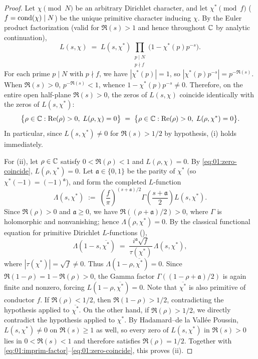 \begin{proof}
Let $\chi \pmod{N}$ be an arbitrary Dirichlet character, and let $\chi^* \pmod{f}$ ($f = \operatorname{cond}(\chi) \mid N$) be the unique primitive character inducing $\chi$. By the Euler product factorization (valid for $\Re(s) > 1$ and hence throughout $\mathbb{C}$ by analytic continuation),
\begin{equation}
\label{eq:01:imprim-factor}
  L(s, \chi) \;=\; L(s, \chi^*) \prod_{\substack{p \mid N \\ p \nmid f}} \bigl(1 - \chi^*(p) p^{-s}\bigr).
\end{equation}
For each prime $p \mid N$ with $p \nmid f$, we have $|\chi^*(p)| = 1$, so $|\chi^*(p) p^{-s}| = p^{-\Re(s)}$. When $\Re(s) > 0$, $p^{-\Re(s)} < 1$, whence $1 - \chi^*(p)p^{-s} \neq 0$. Therefore, on the entire open half-plane $\Re(s) > 0$, the zeros of $L(s, \chi)$ coincide identically with the zeros of $L(s, \chi^*)$:
\begin{equation}
\label{eq:01:zero-coincide}
  \bigl\{\rho \in \mathbb{C} : \operatorname{Re}(\rho) > 0,\; L(\rho,\chi) = 0\bigr\} \;=\; \bigl\{\rho \in \mathbb{C} : \operatorname{Re}(\rho) > 0,\; L(\rho,\chi^*) = 0\bigr\}.
\end{equation}
In particular, since $L(s, \chi^*) \neq 0$ for $\Re(s) > 1/2$ by hypothesis, (i) holds immediately.

For (ii), let $\rho \in \mathbb{C}$ satisfy $0 < \Re(\rho) < 1$ and $L(\rho, \chi) = 0$. By \eqref{eq:01:zero-coincide}, $L(\rho, \chi^*) = 0$. Let $\mathfrak{a} \in \{0, 1\}$ be the parity of $\chi^*$ (so $\chi^*(-1) = (-1)^{\mathfrak{a}}$), and form the completed $L$-function
\[
  \Lambda(s, \chi^*) \;:=\; \left(\frac{f}{\pi}\right)^{(s+\mathfrak{a})/2} \Gamma\!\left(\frac{s+\mathfrak{a}}{2}\right) L(s, \chi^*).
\]
Since $\Re(\rho) > 0$ and $\mathfrak{a} \ge 0$, we have $\Re((\rho + \mathfrak{a})/2) > 0$, where $\Gamma$ is holomorphic and nonvanishing; hence $\Lambda(\rho, \chi^*) = 0$. By the classical functional equation for primitive Dirichlet $L$-functions (),
\[
  \Lambda(1 - s, \overline{\chi^*}) \;=\; \frac{i^{\mathfrak{a}}\sqrt{f}}{\tau(\chi^*)}\,\Lambda(s, \chi^*),
\]
where $|\tau(\chi^*)| = \sqrt{f} \neq 0$. Thus $\Lambda(1 - \rho, \overline{\chi^*}) = 0$. Since $\Re(1 - \rho) = 1 - \Re(\rho) > 0$, the Gamma factor $\Gamma((1 - \rho + \mathfrak{a})/2)$ is again finite and nonzero, forcing $L(1 - \rho, \overline{\chi^*}) = 0$. Note that $\overline{\chi^*}$ is also primitive of conductor $f$. If $\Re(\rho) < 1/2$, then $\Re(1 - \rho) > 1/2$, contradicting the hypothesis applied to $\overline{\chi^*}$. On the other hand, if $\Re(\rho) > 1/2$, we directly contradict the hypothesis applied to $\chi^*$. By Hadamard--de la Vall\'ee Poussin, $L(s, \chi^*) \neq 0$ on $\Re(s) \ge 1$ as well, so every zero of $L(s, \chi^*)$ in $\Re(s) > 0$ lies in $0 < \Re(s) < 1$ and therefore satisfies $\Re(\rho) = 1/2$. Together with \eqref{eq:01:imprim-factor}--\eqref{eq:01:zero-coincide}, this proves (ii).


\end{proof}
